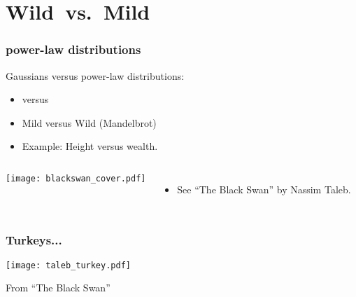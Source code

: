 

\section{Wild\ vs.\ Mild}

\begin{frame}
  \frametitle{power-law distributions}

  \begin{block}{Gaussians versus power-law distributions:}
    \begin{itemize}
    \item<1->
       versus \\
    \item<1->
      \alert{Mild} versus \alert{Wild} (Mandelbrot)
    \item<1->
      Example: Height versus wealth.
    \end{itemize}
  \end{block}

  \begin{block}{}
    \begin{columns}
      \texttt{[image: blackswan\_cover.pdf]}
      \begin{itemize}
      \item 
        See ``The Black Swan'' by Nassim Taleb.\cite{taleb2007a}
      \end{itemize}
    \end{columns}
  \end{block}

\end{frame}

\begin{frame}
  \frametitle{Turkeys...}

  \begin{center}
    \texttt{[image: taleb\_turkey.pdf]}
  \end{center}

  {\small From ``The Black Swan''\cite{taleb2007a}}

\end{frame}

